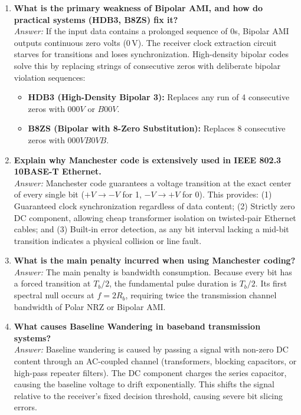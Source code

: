 \documentclass[11pt,a4paper]{article}
\begin{document}
\begin{enumerate}
    \item \textbf{What is the primary weakness of Bipolar AMI, and how do practical systems (HDB3, B8ZS) fix it?}\\
    \textit{Answer:} If the input data contains a prolonged sequence of 0s, Bipolar AMI outputs continuous zero volts ($0\,\mathrm{V}$). The receiver clock extraction circuit starves for transitions and loses synchronization. High-density bipolar codes solve this by replacing strings of consecutive zeros with deliberate bipolar violation sequences:
    \begin{itemize}
        \item \textbf{HDB3 (High-Density Bipolar 3):} Replaces any run of 4 consecutive zeros with $000V$ or $B00V$.
        \item \textbf{B8ZS (Bipolar with 8-Zero Substitution):} Replaces 8 consecutive zeros with $000VB0VB$.
    \end{itemize}

    \item \textbf{Explain why Manchester code is extensively used in IEEE 802.3 10BASE-T Ethernet.}\\
    \textit{Answer:} Manchester code guarantees a voltage transition at the exact center of every single bit ($+V \to -V$ for 1, $-V \to +V$ for 0). This provides: (1) Guaranteed clock synchronization regardless of data content; (2) Strictly zero DC component, allowing cheap transformer isolation on twisted-pair Ethernet cables; and (3) Built-in error detection, as any bit interval lacking a mid-bit transition indicates a physical collision or line fault.

    \item \textbf{What is the main penalty incurred when using Manchester coding?}\\
    \textit{Answer:} The main penalty is bandwidth consumption. Because every bit has a forced transition at $T_b / 2$, the fundamental pulse duration is $T_b / 2$. Its first spectral null occurs at $f = 2 R_b$, requiring twice the transmission channel bandwidth of Polar NRZ or Bipolar AMI.

    \item \textbf{What causes Baseline Wandering in baseband transmission systems?}\\
    \textit{Answer:} Baseline wandering is caused by passing a signal with non-zero DC content through an AC-coupled channel (transformers, blocking capacitors, or high-pass repeater filters). The DC component charges the series capacitor, causing the baseline voltage to drift exponentially. This shifts the signal relative to the receiver's fixed decision threshold, causing severe bit slicing errors.


\end{enumerate}
\end{document}
